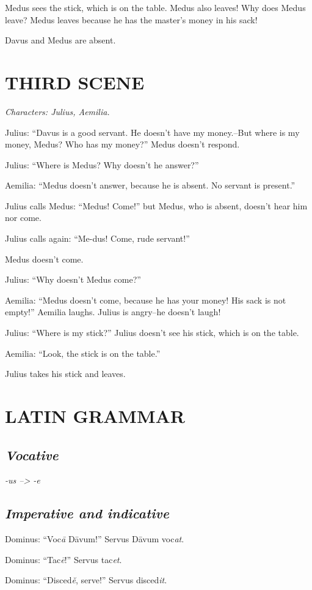 Medus sees the stick, which is on the table. Medus also leaves! Why does Medus leave? Medus leaves because he has the master's money in his sack!

Davus and Medus are absent.

\section[Third scene]{THIRD SCENE}
\emph{Characters: Julius, Aemilia.}

Julius: ``Davus is a good servant. He doesn't have my money.--But where is my money, Medus? Who has my money?'' Medus doesn't respond.

Julius: ``Where is Medus? Why doesn't he answer?''

Aemilia: ``Medus doesn't answer, because he is absent. No servant is present.''

Julius calls Medus: ``Medus! Come!'' but Medus, who is absent, doesn't hear him nor come.

Julius calls again: ``Me-dus! Come, rude servant!''

Medus doesn't come.

Julius: ``Why doesn't Medus come?''

Aemilia: ``Medus doesn't come, because he has your money! His sack is not empty!'' Aemilia laughs. Julius is angry--he doesn't laugh!

Julius: ``Where is my stick?'' Julius doesn't see his stick, which is on the table.

Aemilia: ``Look, the stick is on the table.''

Julius takes his stick and leaves.

\section[Grammar]{LATIN GRAMMAR}
\subsection{\emph{Vocative}}
\emph{-us --> -e}

\subsection{\emph{Imperative and indicative}}
Dominus: ``Voc\emph{\=a} D\=avum!'' Servus D\=avum voc\emph{at}.

Dominus: ``Tac\emph{\=e}!'' Servus tac\emph{et}.

Dominus: ``Disced\emph{\u{e}}, serve!'' Servus disced\emph{it}.


